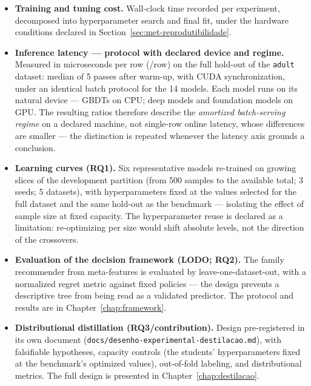 \begin{itemize}
  \item \textbf{Training and tuning cost.} Wall-clock time recorded
    per experiment, decomposed into hyperparameter search and final
    fit, under the hardware conditions declared in
    Section~\ref{sec:met-reprodutibilidade}.
  \item \textbf{Inference latency --- protocol with declared device
    and regime.} Measured in microseconds per row (\us/row) on the
    full hold-out of the \texttt{adult} dataset: median of 5 passes
    after warm-up, with CUDA synchronization, under an identical
    batch protocol for the 14 models. Each model runs on its natural
    device --- GBDTs on CPU; deep models and foundation models on
    GPU. The resulting ratios therefore describe the
    \emph{amortized batch-serving regime} on a declared machine, not
    single-row online latency, whose differences are smaller --- the
    distinction is repeated whenever the latency axis grounds a
    conclusion.
  \item \textbf{Learning curves (RQ1).} Six representative models
    re-trained on growing slices of the development partition (from
    500 samples to the available total; 3 seeds; 5 datasets), with
    hyperparameters fixed at the values selected for the full
    dataset and the same hold-out as the benchmark --- isolating the
    effect of sample size at fixed capacity. The hyperparameter
    reuse is declared as a limitation: re-optimizing per size would
    shift absolute levels, not the direction of the crossovers.
  \item \textbf{Evaluation of the decision framework (LODO; RQ2).}
    The family recommender from meta-features is evaluated by
    leave-one-dataset-out, with a normalized regret metric against
    fixed policies --- the design prevents a descriptive tree from
    being read as a validated predictor. The protocol and results
    are in Chapter~\ref{chap:framework}.
  \item \textbf{Distributional distillation (RQ3/contribution).}
    Design pre-registered in its own document
    (\texttt{docs/\allowbreak desenho-\allowbreak experimental-\allowbreak destilacao.\allowbreak md}),
    with falsifiable hypotheses, capacity controls (the students'
    hyperparameters fixed at the benchmark's optimized values),
    out-of-fold labeling, and distributional metrics. The full
    design is presented in Chapter~\ref{chap:destilacao}.
\end{itemize}

